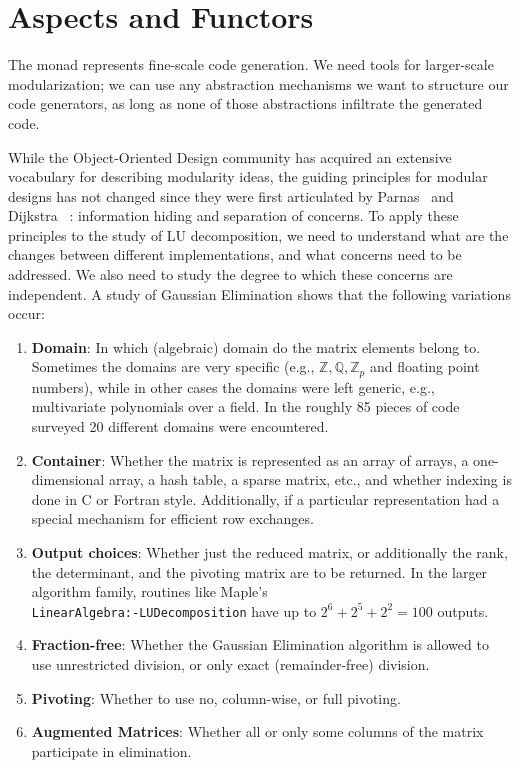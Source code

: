 \documentclass[draft]{elsart}
\begin{document}
\section{Aspects and Functors}\label{functors}
The monad represents fine-scale code generation. We need tools for
larger-scale modularization; we can use any abstraction
mechanisms we want to structure our code generators, as long as none
of those abstractions infiltrate the generated code.

While the Object-Oriented Design community has acquired an extensive
vocabulary for describing modularity ideas, the guiding principles for
modular designs has not changed since they were first articulated by
Parnas~\cite{journals/cacm/parnas72a} and Dijkstra~
\cite{EWD:EWD447}: information hiding and separation of concerns.  To
apply these principles to the study of LU decomposition, we need
to understand what are the changes between different implementations, and 
what concerns need to be addressed.  We also need to study the degree
to which these concerns are independent.
A study of Gaussian Elimination \cite{carette04} shows that
the following variations occur:
\begin{enumerate}
    \item \textbf{Domain}: In which (algebraic) domain do the
      matrix elements belong to.  Sometimes the domains are very
      specific (e.g., $\mathbb{Z}, \mathbb{Q}, \mathbb{Z}_p$ and
      floating point numbers), while in other cases the domains
      were left generic, e.g., multivariate polynomials over a
      field.  In the roughly 85 pieces of code surveyed
      \cite{carette04} 20 different domains were encountered.
    \item \textbf{Container}: Whether the matrix is represented as
      an array of arrays, a one-dimensional array, a hash table, a
      sparse matrix, etc., and whether indexing is done in C or
      Fortran style.  Additionally, if a particular representation
      had a special mechanism for efficient row exchanges.
    \item \textbf{Output choices}: Whether just the reduced
      matrix, or additionally the rank, the determinant, and the
      pivoting matrix are to be returned. In the larger algorithm
      family, routines like Maple's\\
      \texttt{LinearAlgebra:-LUDecomposition} have up to $2^6 +
      2^5 + 2^2 = 100$ outputs.
    \item \textbf{Fraction-free}: Whether the Gaussian Elimination
        algorithm is allowed to use unrestricted division, or only
        exact (remainder-free) division.
    \item \textbf{Pivoting}: Whether to use no, 
        column-wise, or full pivoting.
    \item \textbf{Augmented Matrices}: Whether all or only some
      columns of the matrix participate in elimination.
\end{enumerate}
\end{document}
